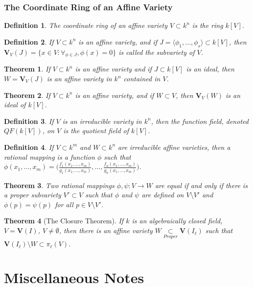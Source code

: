 \documentclass[oneside]{book}
\theoremstyle{mystyle}
\newtheorem{theorem}{Theorem}[section]
\newtheorem{definition}{Definition}[section]
\begin{document}
\subsubsection{The Coordinate Ring of an Affine Variety}
\begin{definition}
The coordinate ring of an affine variety $V\subset k^n$ is the ring $k[V]$.
\end{definition}
\begin{definition}
If $V\subset k^n$ is an affine variety, and if $J = \langle \phi_1,\hdots, \phi_s\rangle \subset k[V]$, then $\mathbf{V}_{V}(J) = \{x\in V:\forall_{\phi \in J}, \phi(x) = 0 \}$ is called the subvariety of $V$.
\end{definition}
\begin{theorem}
If $V\subset k^n$ is an affine variety and if $J\subset k[V]$ is an ideal, then $W = \mathbf{V}_{V}(J)$ is an affine variety in $k^n$ contained in $V$.
\end{theorem}
\begin{theorem}
If $V\subset k^n$ is an affine variety, and if $W\subset V$, then $\mathbf{V}_{V}(W)$ is an ideal of $k[V]$.
\end{theorem}
\begin{definition}
If $V$ is an irreducible variety in $k^n$, then the function field, denoted $QF(k[V])$, on $V$ is the quotient field of $k[V]$.
\end{definition}
\begin{definition}
If $V\subset k^m$ and $W\subset k^n$ are irreducible affine varieties, then a rational mapping is a function $\phi$ such that $\phi(x_1,\hdots, x_m) = \bigg(\frac{f_1(x_1,\hdots, x_m)}{g_1(x_1,\hdots, x_m)}, \hdots, \frac{f_n(x_1,\hdots, x_m)}{g_n(x_1,\hdots, x_m)}\bigg)$.
\end{definition}
\begin{theorem}
Two rational mappings $\phi,\psi:V\rightarrow W$ are equal if and only if there is a proper subvariety $V'\subset V$ such that $\phi$ and $\psi$ are defined on $V\setminus V'$ and $\phi(p) = \psi(p)$ for all $p \in V\setminus V'$.
\end{theorem}
\begin{theorem}[The Closure Theorem]
If $k$ is an algebraically closed field, $V=\mathbf{V}(I)$, $V\ne \emptyset$, then there is an affine variety $W\underset{Proper}\subset \mathbf{V}(I_{\ell})$ such that $\mathbf{V}(I_{\ell})\setminus W \subset \pi_{\ell}(V)$.
\end{theorem}
\section{Miscellaneous Notes}
\end{document}

